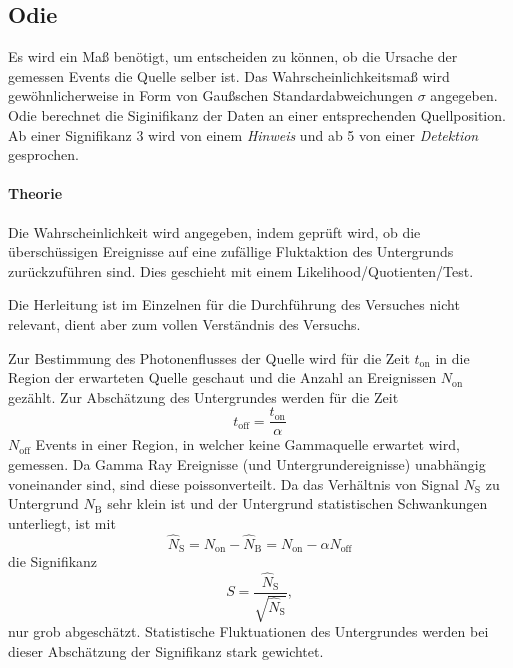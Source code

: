 \subsection{Odie}%
\label{sub:odie}
Es wird ein Maß benötigt, um entscheiden zu können,
ob die Ursache der gemessen Events die Quelle selber ist.
Das Wahrscheinlichkeitsmaß wird gewöhnlicherweise in Form von Gaußschen
Standardabweichungen $\sigma$ angegeben.
Odie berechnet die Siginifikanz der Daten an einer entsprechenden Quellposition.
Ab einer Signifikanz \SI{3}{\sigma} wird von einem \textit{Hinweis}
und ab \SI{5}{\sigma} von einer \textit{Detektion} gesprochen.

\paragraph{Theorie}%

Die Wahrscheinlichkeit wird angegeben, indem geprüft wird,
ob die über\-schüssigen Ereignisse auf eine zufällige
Fluktaktion des Untergrunds zurück\-zu\-führen sind.
Dies geschieht mit einem Likelihood\-/Quotienten\-/Test.

Die Herleitung ist im Einzelnen für die Durchführung des
Versuches nicht relevant,
dient aber zum vollen Verständnis des Versuchs.

Zur Bestimmung des Photonenflusses der Quelle wird für die Zeit $t_\text{on}$ in die Region der
erwarteten Quelle geschaut und die Anzahl an Ereignissen $N_\text{on}$ gezählt.
Zur Abschätzung des Untergrundes werden für die Zeit
\begin{equation*}
    t_\text{off} = \frac{t_\text{on}}{\alpha}
\end{equation*}
$N_\text{off}$
Events in einer Region,
in welcher keine Gammaquelle erwartet wird,
gemessen.
Da Gamma Ray Ereignisse (und Untergrundereignisse)
unabhängig voneinander sind,
sind diese poissonverteilt.
Da das Verhältnis von Signal $N_\text{S}$ zu Untergrund
$N_\text{B}$ sehr klein ist
und der Untergrund statistischen Schwankungen unterliegt,
ist mit
\begin{equation}
	\hat{N}_\text{S} = N_\text{on} - \hat{N}_\text{B} = N_\text{on} - \alpha N_\text{off}
\end{equation}
die Signifikanz
\begin{equation}
	S = \frac{\hat{N}_\text{S}}{\sqrt{\hat{N}_\text{S}}},
\end{equation}
nur grob abgeschätzt.
Statistische Fluktuationen des Untergrundes werden bei dieser Abschätzung der
Signifikanz stark gewichtet.

